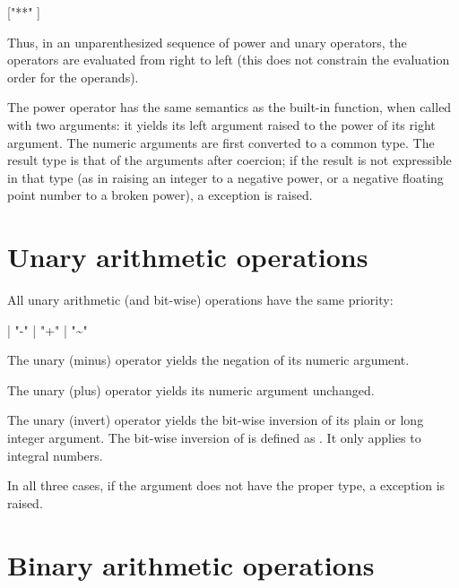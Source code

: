 \begin{productionlist}
             { ["**" ]}
\end{productionlist}

Thus, in an unparenthesized sequence of power and unary operators, the
operators are evaluated from right to left (this does not constrain
the evaluation order for the operands).

The power operator has the same semantics as the built-in
 function, when called with two arguments: it yields
its left argument raised to the power of its right argument.  The
numeric arguments are first converted to a common type.  The result
type is that of the arguments after coercion; if the result is not
expressible in that type (as in raising an integer to a negative
power, or a negative floating point number to a broken power), a
 exception is raised.


\section{Unary arithmetic operations \label{unary}}

All unary arithmetic (and bit-wise) operations have the same priority:

\begin{productionlist}
             { | "-" 
              | "+"  | "{\~}" }
\end{productionlist}

The unary \code{-} (minus) operator yields the negation of its
numeric argument.

The unary \code{+} (plus) operator yields its numeric argument
unchanged.

The unary \code{\~} (invert) operator yields the bit-wise inversion
of its plain or long integer argument.  The bit-wise inversion of
 is defined as .  It only applies to integral
numbers.

In all three cases, if the argument does not have the proper type,
a  exception is raised.


\section{Binary arithmetic operations\label{binary}}

